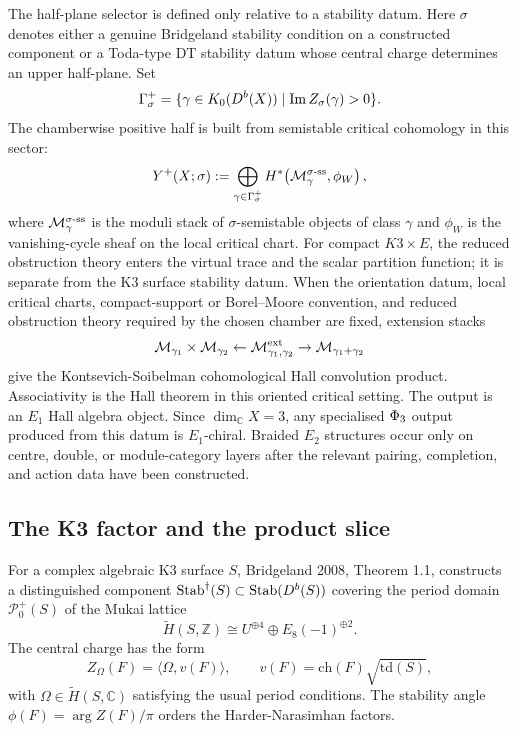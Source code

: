 The half-plane selector is defined only relative to a stability datum.
Here $\sigma$ denotes either a genuine Bridgeland stability condition on
a constructed component or a Toda-type DT stability datum whose central
charge determines an upper half-plane.  Set
\[
  \Gamma_\sigma^{+}
  =
  \{\gamma\in K_0(D^{b}(X))\mid \operatorname{Im}Z_\sigma(\gamma)>0\}.
\]
The chamberwise positive half is built from semistable critical
cohomology in this sector:
\[
  Y^{+}(X;\sigma)
  :=
  \bigoplus_{\gamma\in\Gamma_\sigma^{+}}
  H^{*}\!\left(\mathcal{M}_\gamma^{\sigma\text{-ss}},\phi_W\right),
\]
where $\mathcal{M}_\gamma^{\sigma\text{-ss}}$ is the moduli stack of
$\sigma$-semistable objects of class $\gamma$ and $\phi_W$ is the
vanishing-cycle sheaf on the local critical chart.  For compact
$K3\times E$, the reduced obstruction theory enters the virtual trace
and the scalar partition function; it is separate from the K3 surface
stability datum.  When the orientation datum, local critical charts,
compact-support or Borel--Moore convention, and reduced obstruction
theory required by the chosen chamber are fixed, extension stacks
\[
  \mathcal{M}_{\gamma_1}\times\mathcal{M}_{\gamma_2}
  \leftarrow
  \mathcal{M}_{\gamma_1,\gamma_2}^{\mathrm{ext}}
  \rightarrow
  \mathcal{M}_{\gamma_1+\gamma_2}
\]
give the Kontsevich-Soibelman cohomological Hall convolution product.
Associativity is the Hall theorem in this oriented critical setting.
The output is an $E_1$ Hall algebra object.  Since
$\dim_{\mathbb C}X=3$, any specialised $\Phi_3$ output produced from
this datum is $E_1$-chiral.  Braided $E_2$ structures occur only on
centre, double, or module-category layers after the relevant pairing,
completion, and action data have been constructed.

\subsection*{The K3 factor and the product slice}

For a complex algebraic K3 surface $S$, Bridgeland 2008, Theorem 1.1,
constructs a distinguished component
$\mathrm{Stab}^\dagger(S)\subset\mathrm{Stab}(D^{b}(S))$ covering the period domain
$\mathcal P_0^+(S)$ of the Mukai lattice
\[
  \widetilde H(S,\mathbb Z)
  \cong U^{\oplus 4}\oplus E_8(-1)^{\oplus 2}.
\]
The central charge has the form
\[
  Z_\Omega(F)=\langle \Omega,v(F)\rangle,\qquad
  v(F)=\mathrm{ch}(F)\sqrt{\mathrm{td}(S)},
\]
with $\Omega\in\widetilde H(S,\mathbb C)$ satisfying the usual period
conditions.  The stability angle $\phi(F)=\arg Z(F)/\pi$ orders the
Harder-Narasimhan factors.

